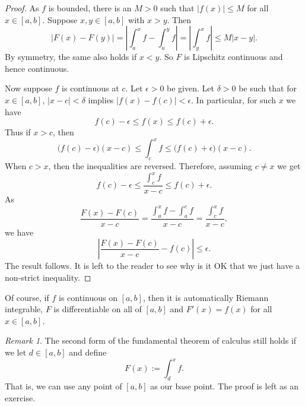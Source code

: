 \documentclass[12pt]{book}
\newcommand{\abs}[1]{\left\lvert {#1} \right\rvert}
\theoremstyle{plain}
\theoremstyle{remark}
\newtheorem{remark}[thm]{Remark}
\theoremstyle{definition}
\theoremstyle{exercise}
\theoremstyle{example}
\begin{document}
\begin{proof}
As $f$ is bounded, there is an $M > 0$
such that $\abs{f(x)} \leq M$ for all $x \in [a,b]$.  Suppose $x,y \in [a,b]$
with $x > y$.  Then
\begin{equation*}
\abs{F(x)-F(y)} =
\abs{\int_a^x f - \int_a^y f}
=
\abs{\int_y^x f}
\leq
M\abs{x-y} .
\end{equation*}
By symmetry, the same also holds if $x < y$.
So $F$ is Lipschitz continuous and hence continuous.

Now suppose $f$ is continuous at $c$.
Let $\epsilon > 0$ be given.  Let $\delta > 0$ be such that
for $x \in [a,b]$,
$\abs{x-c} < \delta$ implies $\abs{f(x)-f(c)} < \epsilon$.
In particular,
for such $x$ we have
\begin{equation*}
f(c)-\epsilon \leq f(x) \leq f(c) + \epsilon.
\end{equation*}
Thus if $x > c$, then
\begin{equation*}
\bigl(f(c)-\epsilon\bigr) (x-c) \leq \int_c^x f \leq
\bigl(f(c) + \epsilon\bigr)(x-c).
\end{equation*}
When $c > x$, then the inequalities are reversed.  Therefore,
assuming $c \not= x$ we get
\begin{equation*}
f(c)-\epsilon
\leq
\frac{\int_c^{x} f}{x-c}
\leq
f(c)+\epsilon .
\end{equation*}
As 
\begin{equation*}
\frac{F(x)-F(c)}{x-c}
=
\frac{\int_a^{x} f - \int_a^{c} f}{x-c}
=
\frac{\int_c^{x} f}{x-c} ,
\end{equation*}
we have 
\begin{equation*}
\abs{\frac{F(x)-F(c)}{x-c} - f(c)} \leq \epsilon .
\end{equation*}
The result follows.  It is left to the reader to see why is it OK that we
just have a non-strict inequality.
\end{proof}

Of course, if $f$ is continuous on $[a,b]$, then it is automatically Riemann
integrable, $F$ is differentiable on all of $[a,b]$ and $F'(x) = f(x)$ for
all $x \in [a,b]$.

\begin{remark} \label{remark:fundthmbase}
The second form of the fundamental theorem of calculus still holds if
we let $d \in [a,b]$ and define
\begin{equation*}
F(x) := \int_d^x f .
\end{equation*}
That is, we can use any point of $[a,b]$ as our base point.  The proof is
left as an exercise.
\end{remark}
\end{document}
